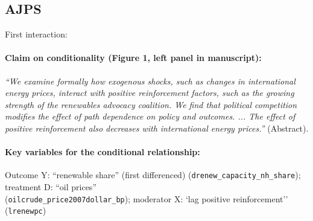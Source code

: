 \documentclass[12pt]{article}
\begin{document}
\subsection{\citet{Aklin2013} AJPS} \label{aklin}

First interaction:

\paragraph{Claim on conditionality (Figure 1, left panel in manuscript):} \emph{``We examine formally how exogenous shocks, such as changes in international energy prices, interact with positive reinforcement factors, such as the growing strength of the renewables advocacy coalition. We find that political competition modifies the effect of path dependence on policy and outcomes. ... The effect of positive reinforcement also decreases with international energy prices.''} (Abstract). 

\paragraph{Key variables for the conditional relationship:} Outcome Y:
``renewable share'' (first differenced) (\texttt{drenew\_capacity\_nh\_share}); treatment D:  ``oil prices'' \\
(\texttt{oilcrude\_price2007dollar\_bp}); moderator X: `lag positive reinforcement'' (\texttt{lrenewpc})
\clearpage
\end{document}
